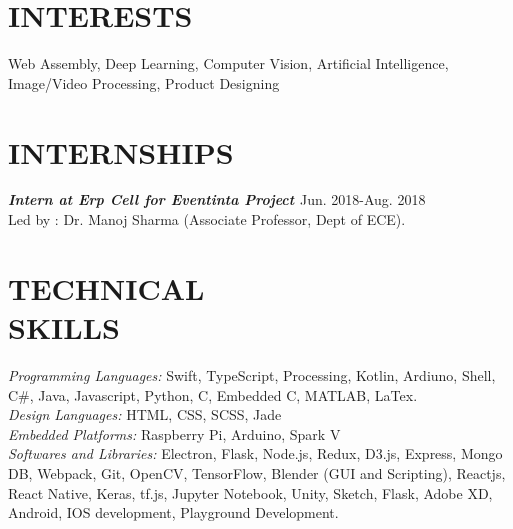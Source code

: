 \documentclass[margin, 10pt]{res}
\begin{document}
    \begin{resume}
    
     
    \section{INTERESTS}  
    
    Web Assembly, Deep Learning, Computer Vision, Artificial Intelligence, Image/Video Processing, Product Designing
    
    
    \section{INTERNSHIPS}
    
    {\sl \bf{Intern at Erp Cell for Eventinta Project }}\null\hfill Jun. 2018-Aug. 2018\\
    Led by : Dr. Manoj Sharma (Associate Professor, Dept of ECE). 
    
    
    \section{TECHNICAL \\ SKILLS} 
    
    {\sl Programming Languages:} Swift, TypeScript, Processing, Kotlin, Ardiuno, Shell, C\#, Java, Javascript, Python, C, Embedded C, MATLAB, LaTex. \\
    {\sl Design Languages:} HTML, CSS, SCSS, Jade \\
    {\sl Embedded Platforms:} Raspberry Pi, Arduino, Spark V\\
    {\sl Softwares and Libraries:} Electron, Flask, Node.js, Redux, D3.js, Express, Mongo DB, Webpack, Git, OpenCV, TensorFlow, Blender (GUI and Scripting), Reactjs, React Native, Keras, tf.js, Jupyter Notebook, Unity, Sketch, Flask, Adobe XD, Android, IOS development, Playground Development. 
    

\end{resume}
\end{document}
